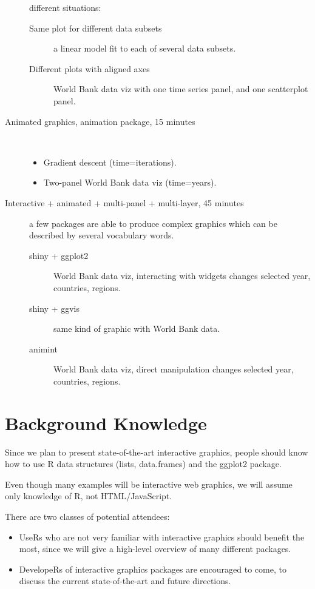 \documentclass[11pt]{article}
\begin{document}
\begin{description}
different situations:
\begin{description}
\item[{Same plot for different data subsets}] a linear model fit to each
of several data subsets.
\item[{Different plots with aligned axes}] World Bank data viz with one
time series panel, and one scatterplot panel.
\end{description}
\item[{Animated graphics, animation package, 15 minutes}] \mbox{ }
\begin{itemize}
\item Gradient descent (time=iterations).
\item Two-panel World Bank data viz (time=years).
\end{itemize}
\item[{Interactive + animated + multi-panel + multi-layer, 45 minutes}] a
few packages are able to produce complex graphics which can be
described by several vocabulary words.
\begin{description}
\item[{shiny + ggplot2}] World Bank data viz, interacting with widgets
changes selected year, countries, regions.
\item[{shiny + ggvis}] same kind of graphic with World Bank data.
\item[{animint}] World Bank data viz, direct manipulation changes
selected year, countries, regions.
\end{description}
\end{description}

\section{Background Knowledge}
\label{sec:orgheadline12}

Since we plan to present state-of-the-art interactive graphics, people
should know how to use R data structures (lists, data.frames) and the
ggplot2 package. 

Even though many examples will be interactive web graphics, we will
assume only knowledge of R, not HTML/JavaScript.

There are two classes of potential attendees:
\begin{itemize}
\item UseRs who are not very familiar with interactive graphics should
benefit the most, since we will give a high-level overview of many
different packages.
\item DevelopeRs of interactive graphics packages are encouraged to
  come, to discuss the current state-of-the-art and future directions.
\end{itemize}
\end{document}
